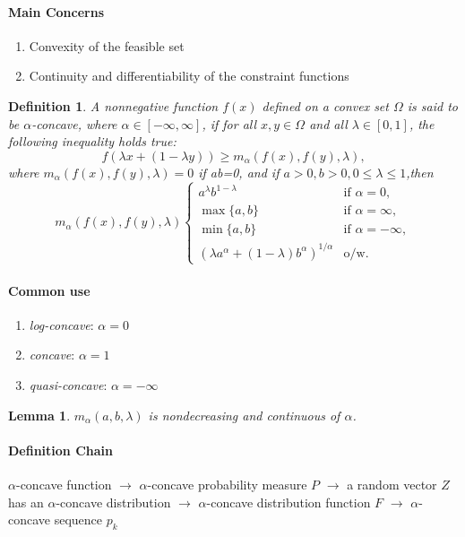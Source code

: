\documentclass[a4pper,11pt]{article}
\newtheorem{defn}{Definition}[section]
\newtheorem{lemma}{Lemma}[section]
\begin{document}
\paragraph{Main Concerns}
\begin{enumerate}
    \item Convexity of the feasible set
    \item Continuity and differentiability of the constraint functions
\end{enumerate}
\begin{defn}
    A nonnegative function $f(x)$ defined on a convex set $\Omega$ is said to be $\alpha$-concave, where $\alpha \in[-\infty,\infty]$, if for all $x,y\in \Omega$ and all $\lambda\in[0,1]$, the following inequality holds true:
    $$f(\lambda x+(1-\lambda y))\geq m_\alpha (f(x),f(y),\lambda),$$
    where $m_\alpha (f(x),f(y),\lambda)=0$ if ab=0, and if $a>0,b>0, 0\leq \lambda \leq 1$,then
    $$
        m_\alpha (f(x),f(y),\lambda)\begin{cases}
            a^\lambda b^{1-\lambda}                            & \text{if } \alpha=0,       \\
            \max\{a,b\}                                        & \text{if } \alpha=\infty,  \\
            \min\{a,b\}                                        & \text{if } \alpha=-\infty, \\
            (\lambda a^\alpha+(1-\lambda) b^\alpha)^{1/\alpha} & \text{o/w}.
        \end{cases}
    $$
\end{defn}
\paragraph{Common use}
\begin{enumerate}
    \item \textit{log-concave}: $\alpha=0$
    \item \textit{concave}: $\alpha=1$
    \item \textit{quasi-concave}: $\alpha=-\infty$
\end{enumerate}

\begin{lemma}
    $m_\alpha(a,b,\lambda)$ is nondecreasing and continuous of $\alpha$.
\end{lemma}

\paragraph{Definition Chain} $\alpha$-concave function $\to$ $\alpha$-concave probability measure $P$ $\to$ a random vector $Z$ has an $\alpha$-concave distribution $\to$ $\alpha$-concave distribution function $F$ $\to$ $\alpha$-concave sequence $p_k$
\end{document}
